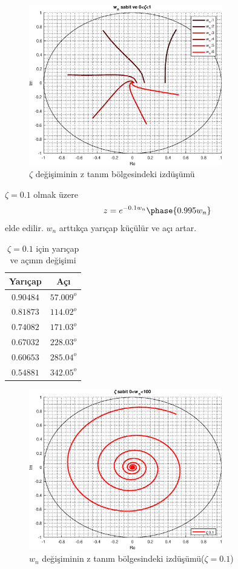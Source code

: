 \begin{figure}[!htb]
    \centering
    \includegraphics[width=0.75\textwidth]{img/lec6_plot1}
    \caption{$\zeta$ değişiminin z tanım bölgesindeki izdüşümü}
    \label{fig:lec6_plot1}
\end{figure}
$\zeta=0.1$ olmak üzere
\begin{equation}
        z=e^{-0.1w_n}\phase{0.995w_n}
\end{equation}
elde edilir. $w_n$ arttıkça yarıçap küçülür ve açı artar. 
\begin{table}[!htb]
    \centering
    \caption{$\zeta=0.1$ için yarıçap ve açının değişimi}\label{tbl:yaricap_aci2}
    \begin{tabular}{cc}\hline
        Yarıçap& Açı\\\hline
        $0.90484$&  $57.009^o$\\
        $0.81873$&  $114.02^o$\\
        $0.74082$&  $171.03^o$\\
        $0.67032$&  $228.03^o$\\
        $0.60653$&  $285.04^o$\\
        $0.54881$&  $342.05^o$\\\hline
    \end{tabular}
\end{table}

\begin{figure}[!htb]
    \centering
    \includegraphics[width=0.75\textwidth]{img/lec6_plot2}
    \caption{$w_n$ değişiminin z tanım bölgesindeki izdüşümü($\zeta=0.1$)}
    \label{fig:lec6_plot2}
\end{figure}

